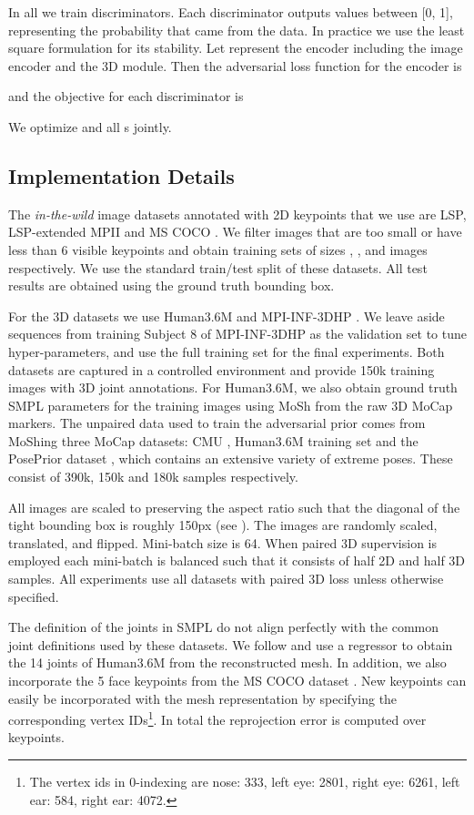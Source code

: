 \documentclass[10pt,twocolumn,letterpaper]{article}
\begin{document}
In all we train  discriminators. Each discriminator  outputs values
between [0, 1], representing the probability that  came from the data. In
practice we use the least square formulation \cite{LSGAN} for its
stability. Let  represent the encoder including the image encoder and the 3D module. Then the adversarial loss function for the encoder is

and the objective for each discriminator is

We optimize  and all s jointly. 
 \subsection{Implementation Details}
\label{sec:training}
The \emph{in-the-wild} image datasets annotated with 2D keypoints that we use
are LSP, LSP-extended \cite{LSP} MPII \cite{andriluka14cvpr} and MS COCO 
\cite{coco}. We filter images that are too small or have less than 6 visible
keypoints and obtain training sets of sizes , ,  and
 images respectively. We use the standard train/test split of these
datasets. All test results are obtained using the ground truth bounding box.

For the 3D datasets we use Human3.6M \cite{Human36m:2014} and 
MPI-INF-3DHP \cite{VNect}. We leave aside sequences from training Subject 8 of
MPI-INF-3DHP as the validation set to tune hyper-parameters, and use the full
training set for the final experiments. 
Both datasets are captured in a controlled environment and provide 150k training images with 3D joint annotations. For Human3.6M, we also obtain ground truth SMPL parameters for the training
images using MoSh \cite{Mosh} from the raw 3D MoCap markers. The unpaired data used to train the adversarial prior comes from
 MoShing three MoCap datasets: CMU \cite{cmumocap}, Human3.6M
training set \cite{Human36m:2014} and the PosePrior dataset
\cite{Akhter}, which contains an extensive variety of extreme
poses. These consist of 390k, 150k and 180k samples respectively.

All images are scaled to  preserving the aspect ratio such
that the diagonal of the tight bounding box is roughly 150px (see \cite{LSP}).
The images are randomly scaled, translated, and flipped. Mini-batch size is 64. 
When paired 3D supervision is employed each mini-batch is balanced such that it
consists of half
2D and half 3D samples. All experiments use all datasets with paired 3D loss unless otherwise specified.

The definition of the  joints in SMPL do not align perfectly with the
common joint definitions used by these datasets. We follow \cite{SMPLify,UP} and
use a regressor to obtain the 14 joints of Human3.6M from the reconstructed
mesh. In addition, we also incorporate the 5 face keypoints from the MS COCO dataset
\cite{coco}. New keypoints can easily be incorporated with the mesh
representation by specifying the corresponding vertex IDs\footnote{The vertex
  ids in 0-indexing are
nose: 333, left eye: 2801, right eye: 6261, left ear: 584, right ear: 4072.}. In total the
reprojection error is computed over  keypoints. 
\end{document}

